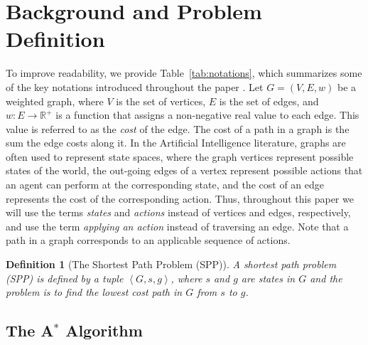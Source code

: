 \documentclass{aicom2e}
\newtheorem{definition}{Definition}
\newcommand{\astar}{A$^*$}
\newcommand{\tuple}[1]{\ensuremath{\left \langle #1 \right \rangle }}
\newcommand{\roni}[1]{\textbf{[RS:#1]}}
\begin{document}

\section{Background and Problem Definition}


To improve readability, we provide Table~\ref{tab:notations}, which
summarizes some of the key notations introduced throughout the paper .
Let $G=(V,E,w)$ be a weighted graph, where $V$ is the set of vertices, $E$ is
the set of edges, and $w:E\rightarrow \mathbb{R}^+$ is a function that assigns
a non-negative real value to each edge. This value is referred to as the {\em
cost} of the edge. The cost of a path in a graph is the sum the edge costs
along it. In the Artificial Intelligence literature, graphs are often used to
represent state spaces, where the graph vertices represent possible states of
the world, the out-going edges of a vertex represent possible actions that an
agent can perform at the corresponding state, and the cost of an edge
represents the cost of the corresponding action. Thus, throughout this paper we
will use the terms {\em states} and {\em actions} instead of vertices and
edges, respectively, and use the term {\em applying an action} instead of
traversing an edge. Note that a path in a graph corresponds to an applicable
sequence of actions.

\begin{definition}[The Shortest Path Problem (SPP)]
A shortest path problem (SPP) is defined by a tuple $\tuple{G,s,g}$, where $s$
and $g$ are states in $G$ and the problem is to find the lowest cost path in
$G$ from $s$ to $g$. \label{def:spp}
\end{definition}

\subsection{The \astar{} Algorithm}
\end{document}
